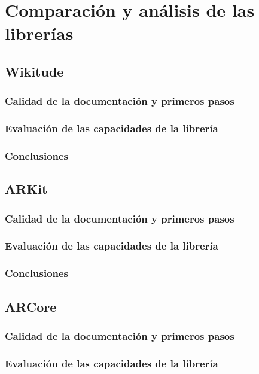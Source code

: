 
\chapter{Comparación y análisis de las librerías}

\section{Wikitude}

\subsection{Calidad de la documentación y primeros pasos}
\subsection{Evaluación de las capacidades de la librería}
\subsection{Conclusiones}

\section{ARKit}
\subsection{Calidad de la documentación y primeros pasos}
\lipsum[1]
\subsection{Evaluación de las capacidades de la librería}
\lipsum[1]
\subsection{Conclusiones}
\lipsum[1]

\section{ARCore}
\subsection{Calidad de la documentación y primeros pasos}
\lipsum[1]
\subsection{Evaluación de las capacidades de la librería}
\lipsum[1]
